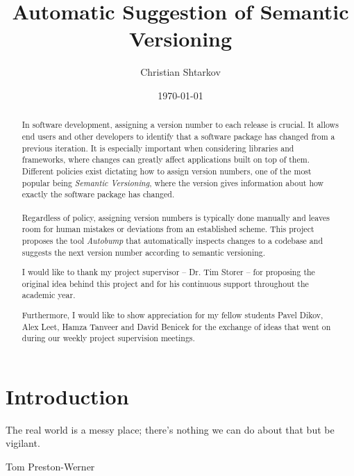 \documentclass{l4proj}
\begin{document}
\title{Automatic Suggestion of Semantic Versioning}
\author{Christian Shtarkov}
\date{\today}
\maketitle

\begin{abstract}
In software development, assigning a version number
to each release is crucial. It allows end users and other developers
to identify that a software package has changed from a previous
iteration. It is especially important when considering libraries and
frameworks, where changes can greatly affect applications built on top
of them. \\ Different policies exist dictating how to assign version
numbers, one of the most popular being \textit{Semantic
Versioning}, where the version gives
information about how exactly the software package has changed.
\\\\
Regardless of
policy, assigning version numbers is typically done manually and
leaves room for human mistakes or deviations from an established
scheme. This project proposes the tool \textit{Autobump} that automatically
inspects changes to a codebase and suggests the next version number
according to semantic versioning.
\end{abstract}

\renewcommand{\abstractname}{Acknowledgments}
\begin{abstract}
I would like to thank my project supervisor -- Dr. Tim Storer -- for
proposing the original idea behind this project and for his continuous
support throughout the academic year.

\noindent Furthermore, I would like to show appreciation for my fellow students
Pavel Dikov, Alex Leet, Hamza Tanveer and David Benicek for the
exchange of ideas that went on during our weekly project supervision
meetings.
\end{abstract}

\educationalconsent

\tableofcontents


\chapter{Introduction}

\epigraph{The real world is a messy place; there’s nothing we can do
about that but be vigilant.}{Tom Preston-Werner}
\end{document}
